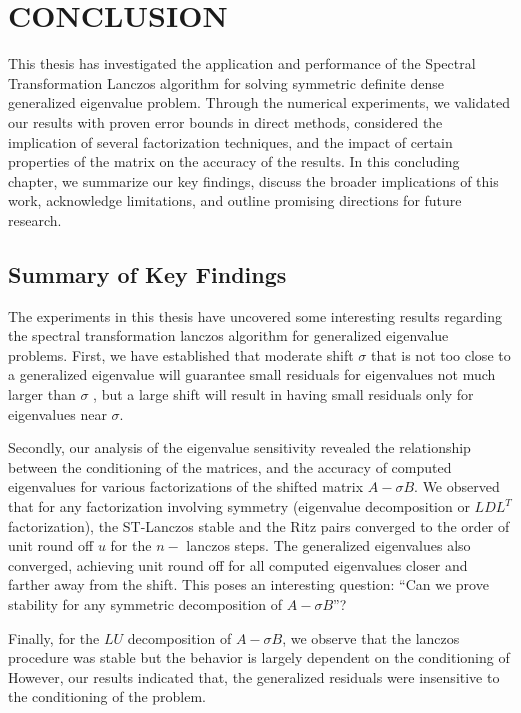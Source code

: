 \chapter{CONCLUSION}
This thesis has investigated the application and performance of the Spectral Transformation Lanczos algorithm for solving symmetric definite dense generalized eigenvalue problem. Through the numerical experiments, we validated our results with proven error bounds in direct methods, considered the implication of several factorization techniques, and the impact of certain properties of the matrix on the accuracy of the results. In this concluding chapter, we summarize our key findings, discuss the broader implications of this work, acknowledge limitations, and outline promising directions for future research.

\section{Summary of Key Findings}
The experiments in this thesis have uncovered some interesting results regarding the spectral transformation lanczos algorithm for generalized eigenvalue problems. First, we have established that moderate shift $\sigma$ that is not too close to a generalized eigenvalue will guarantee small residuals for eigenvalues not much larger than $\sigma$ , but a large shift will result in having small residuals only for eigenvalues near $\sigma$.

Secondly, our analysis of the eigenvalue sensitivity revealed the relationship between the conditioning of the matrices, and the accuracy of computed eigenvalues for various factorizations of the shifted matrix $A-\sigma B$. We observed that for any factorization involving symmetry (eigenvalue decomposition or $LDL^T$ factorization), the ST-Lanczos  stable and the Ritz pairs converged to the order of unit round off $u$ for the $n-$ lanczos steps. The generalized eigenvalues also converged, achieving unit round off for all computed eigenvalues closer and farther away from the shift. This poses an interesting question: ``Can we prove stability for any symmetric decomposition of $A - \sigma B$''?

Finally, for the $LU$ decomposition of $A - \sigma B$, we observe that the lanczos procedure was stable but the behavior is largely dependent on the conditioning of  However, our results indicated that, the generalized residuals were insensitive to the conditioning of the problem.

